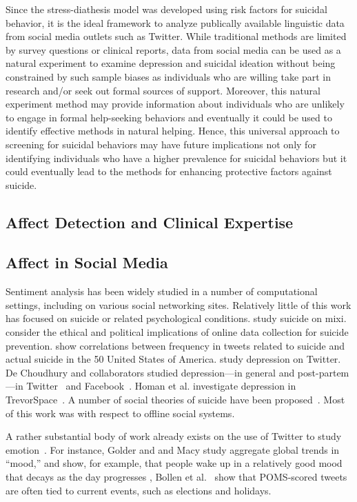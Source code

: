 \documentclass[11pt]{article}
\begin{document}
	Since the stress-diathesis model was developed using risk factors for suicidal behavior, it is the ideal framework to analyze publically available linguistic data from social media outlets such as Twitter. While traditional methods are limited by survey questions or clinical reports, data from social media can be used as a natural experiment to examine depression and suicidal ideation without being constrained by such sample biases as individuals who are willing take part in research and/or seek out formal sources of support. Moreover, this natural experiment method may provide information about individuals who are unlikely to engage in formal help-seeking behaviors and eventually it could be used to identify effective methods in natural helping. Hence, this universal approach to screening for suicidal behaviors may have future implications not only for identifying individuals who have a higher prevalence for suicidal behaviors but it could eventually lead to the methods for enhancing protective factors against suicide.  


\subsection{Affect Detection and Clinical Expertise}
\subsection{Affect in Social Media}

Sentiment analysis has been widely studied in a number of computational settings, including on various social networking sites. Relatively little of this work has focused on suicide or related psychological conditions. \cite{masuda2013suicide} study suicide on mixi. \cite{cheng2012opportunities} consider the ethical and political implications of online data collection for suicide prevention. \cite{Jay} show correlations between frequency in tweets related to suicide and actual suicide in the 50 United States of America. \cite{sadilek2014modeling} study depression on Twitter. De Choudhury and collaborators studied depression---in general and post-partem---in Twitter~\cite{de2012not,de2012happy,de2013major,de2013understanding} and Facebook~\cite{de2014characterizing}. Homan et al. investigate depression in TrevorSpace~\cite{homan2014social}. A number of social theories of suicide have been proposed~\cite{wray2011sociology}. Most of this work was with respect to offline social systems. 

A rather substantial body of work already exists on the use of Twitter to study emotion~\cite{bollen2011twitter,dodds2011temporal,wang2012harnessing,pfitzner2012emotional,kim2012you,bollen2011happiness,pfitzner2012emotional,bollen2011modeling,mohammad2012emotional,golder2011diurnal,de2012not,de2012happy,de2013major,de2013understanding,hannak2012tweetin,thelwall2011sentiment,pak2010twitter}. For instance,
Golder and and Macy study aggregate global trends in ``mood,'' and show, for example, that people wake up in a relatively good mood that decays as the day progresses \cite{golder2011diurnal}, Bollen et al.~\cite{bollen2011modeling} show that POMS-scored tweets are often tied to current events, such as elections and holidays.
\end{document}
